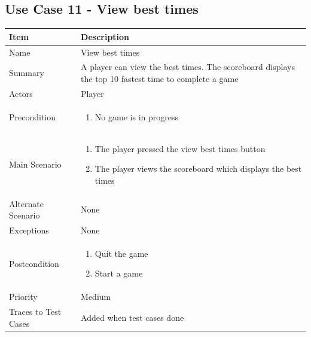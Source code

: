 \documentclass[12pt]{article}
\begin{document}
\newpage


\subsection{Use Case 11 - View best times}

\begin{center}
\setlength{\tabcolsep}{18pt}
\renewcommand{\arraystretch}{1.3}
\begin{tabular}{ |p{3.4cm}|p{10cm}| }
    \hline
   \textbf{Item} & \textbf{Description} \\
    \hline
    Name & View best times \\
    \hline
    Summary & A player can view the best times. The scoreboard displays the top 10 fastest time to complete a game \\
    \hline
    Actors & Player \\
    \hline
    Precondition & 
    \vspace*{-0.1in}
    \begin{enumerate}[leftmargin=0.2in]
     
        \item No game is in progress
        
    \end{enumerate}  \\
    \hline
    Main Scenario & 
    \vspace*{-0.1in}
    \begin{enumerate}[leftmargin=0.2in]
        \item The player pressed the view best times button
        \item The player views the scoreboard which displays the best times
       
    \end{enumerate}  \\
    \hline
    Alternate Scenario & None \\
    \hline
    Exceptions & None \\
    \hline
    Postcondition & 
    \vspace*{-0.1in}
    \begin{enumerate}[leftmargin=0.2in]
        \item Quit the game
        \item Start a game
    \end{enumerate} \\
    \hline
    Priority & Medium \\
    \hline
    \small{Traces to Test Cases} & Added when test cases done  \\
    \hline
\end{tabular}
\end{center}
\end{document}
